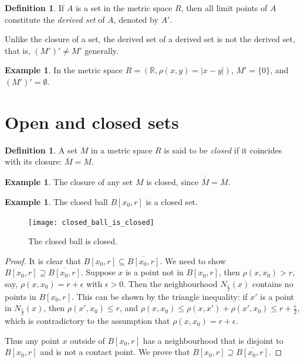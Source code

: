 \documentclass[a4paper,12pt]{article}
\newcommand{\realR}{\mathbb{R}}
\theoremstyle{definition}
\newtheorem{defn}[thm]{Definition}
\newtheorem{expl}[thm]{Example}
\theoremstyle{remark}
\begin{document}
\begin{defn}
  If $A$ is a set in the metric space $R$, then all limit points of $A$ constitute the \emph{derived set} of $A$, denoted by $A'$.
\end{defn}
Unlike the closure of a set, the derived set of a derived set is not the derived set, that is, $(M')' \neq M'$ generally.
\begin{expl}
  In the metric space $R = (\realR, \rho(x, y) = \lvert x - y \rvert)$, $M' = \{ 0 \}$, and $(M')' = \emptyset$. 
\end{expl}

\section{Open and closed sets}

\begin{defn}
  A set $M$ in a metric space $R$ is said to be \emph{closed} if it coincides with its closure: $\overline{M} = M$.
\end{defn}

\begin{expl}
  The closure of any set $M$ is closed, since $\overline{\overline{M}} = \overline{M}$.
\end{expl}

\begin{expl}
  The closed ball $B[x_0, r]$ is a closed set.
\end{expl}
\begin{figure}[h]
  \centering
  \texttt{[image: closed\_ball\_is\_closed]}
  \caption{The closed ball is closed.}
\end{figure}
\begin{proof}
  It is clear that $B[x_0, r] \subseteq \overline{B[x_0, r]}$. We need to show $B[x_0, r] \supseteq \overline{B[x_0, r]}$. Suppose $x$ is a point not in $B[x_0, r]$, then $\rho(x, x_0) > r$, say, $\rho(x, x_0) = r + \epsilon$ with $\epsilon > 0$. Then the neighbourhood $N_{\frac{\epsilon}{2}}(x)$ contains no points in $B[x_0, r]$. This can be shown by the triangle inequality: if $x'$ is a point in $N_{\frac{\epsilon}{2}}(x)$, then $\rho(x', x_0) \leq r$, and $\rho(x, x_0) \leq \rho(x, x') + \rho(x', x_0) \leq r + \frac{\epsilon}{2}$, which is contradictory to the assumption that $\rho(x, x_0) = r + \epsilon$.

  Thus any point $x$ outside of $B[x_0, r]$ has a neighbourhood that is disjoint to $B[x_0, r]$ and is not a contact point. We prove that $B[x_0, r] \supseteq \overline{B[x_0, r]}$.
\end{proof}
\end{document}
